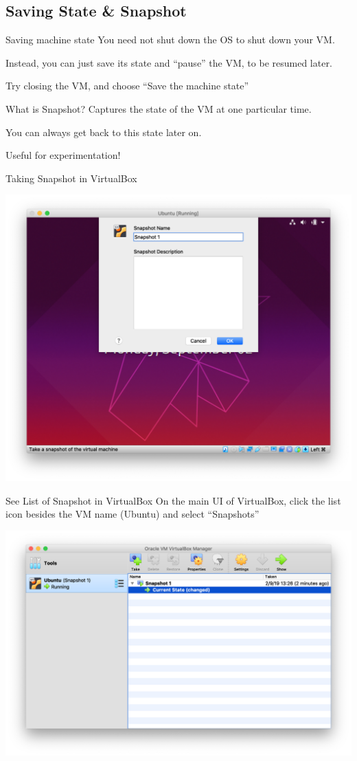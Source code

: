 \documentclass[12pt]{beamer}
\begin{document}
\subsection{Saving State \& Snapshot}
\begin{frame}{Saving machine state}
  You need not shut down the OS to shut down your VM.

  Instead, you can just save its state and ``pause'' the VM, to be resumed later.

  Try closing the VM, and choose ``Save the machine state''
\end{frame}

\begin{frame}{What is Snapshot?}
  Captures the state of the VM at one particular time.

  You can always get back to this state later on.

  Useful for experimentation!
\end{frame}

\begin{frame}{Taking Snapshot in VirtualBox}
  \begin{center}
    \includegraphics[width=0.7\linewidth]{snapshot}
  \end{center}
\end{frame}

\begin{frame}{See List of Snapshot in VirtualBox}
  On the main UI of VirtualBox, click the list icon besides the VM name (Ubuntu) and select ``Snapshots''
  \begin{center}
    \includegraphics[width=0.8\linewidth]{vb-snapshots}
  \end{center}
\end{frame}
\end{document}
